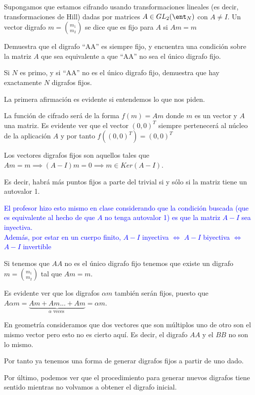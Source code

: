 \begin{problem}[8]
Supongamos que estamos cifrando usando transformaciones lineales (es decir, transformaciones de Hill) dadas por matrices $A \in GL_2(\ent_N)$ con $A \neq I$. Un vector digrafo $m={m_1 \choose m_2}$ se dice que es fijo para $A$ si $Am=m$

\ppart
Demuestra que el digrafo ``AA'' es siempre fijo, y encuentra una condición sobre la matriz $A$ que sea equivalente a que ``AA'' no sea el único digrafo fijo.

\ppart
Si $N$ es primo, y si ``AA'' no es el único digrafo fijo, demuestra que hay exactamente $N$ digrafos fijos.
\solution
{}

\spart

La primera afirmación es evidente si entendemos lo que nos piden.

La función de cifrado será de la forma $f(m)=Am$ donde $m$ es un vector y $A$ una matriz. Es evidente ver que el vector $(0,0)^T$ siempre pertenecerá al núcleo de la aplicación $A$ y por tanto $f((0,0)^T) = (0,0)^T$

Los vectores digrafos fijos son aquellos tales que $Am=m \implies (A-I)m = 0 \implies m \in Ker(A-I)$.

Es decir, habrá más puntos fijos a parte del trivial si y sólo si la matriz tiene un autovalor 1.

\textcolor{blue}{El profesor hizo esto mismo en clase considerando que la condición buscada (que es equivalente al hecho de que $A$ no tenga autovalor 1) es que la matriz $A-I$ sea inyectiva. \\Además, por estar en un cuerpo finito, $A-I$ inyectiva $\iff$ $A-I$ biyectiva $\iff$ $A-I$ invertible}

\spart

Si tenemos que $AA$ no es el único digrafo fijo tenemos que existe un digrafo $m={m_1 \choose m_2}$ tal que $Am=m$.

Es evidente ver que los digrafos $αm$ también serán fijos, puesto que $Aαm = \underbrace{Am + Am ... + Am}_{α \text{ veces }} =  αm$.

En geometría consideramos que dos vectores que son múltiplos uno de otro son el mismo vector pero esto no es cierto aquí. Es decir, el digrafo $AA$ y el $BB$ no son lo mismo.

Por tanto ya tenemos una forma de generar digrafos fijos a partir de uno dado.

Por último, podemos ver que el procedimiento para generar nuevos digrafos tiene sentido mientras no volvamos a obtener el digrafo inicial.


\end{problem}
